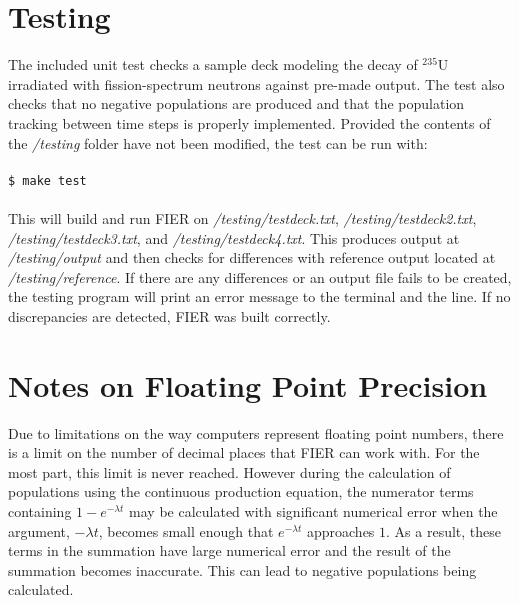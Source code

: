 \documentclass{article}
\begin{document}
\section{Testing}
The included unit test checks a sample deck modeling the decay of $^{235}$U irradiated with fission-spectrum neutrons against pre-made output. The test also checks that no negative populations are produced and that the population tracking between time steps is properly implemented. Provided the contents of the \textit{/testing} folder have not been modified, the test can be run with: \\\\
\texttt{\$ make test}
\\\\
\noindent This will build and run FIER on \textit{/testing/testdeck.txt}, \textit{/testing/testdeck2.txt}, \textit{/testing/testdeck3.txt}, and \textit{/testing/testdeck4.txt}. This produces output at \textit{/testing/output} and then checks for differences with reference output located at \textit{/testing/reference}. If there are any differences or an output file fails to be created, the testing program will print an error message to the terminal and the line. If no discrepancies are detected, FIER was built correctly. \\

\section{Notes on Floating Point Precision}
Due to limitations on the way computers represent floating point numbers, there is a limit on the number of decimal places that FIER can work with. For the most part, this limit is never reached. However during the calculation of populations using the continuous production equation, the numerator terms containing $1 - e^{-\lambda t}$ may be calculated with significant numerical error when the argument, $-\lambda t$, becomes small enough that $e^{-\lambda t}$ approaches $1$. As a result, these terms in the summation have large numerical error and the result of the summation becomes inaccurate. This can lead to negative populations being calculated. \\
\end{document}
